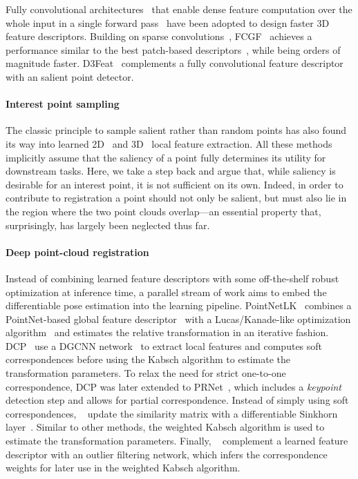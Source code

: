 Fully convolutional architectures~\cite{long2015fully} that enable dense feature computation over the whole input in a single forward pass~\cite{detone2018superpoint, dusmanu2019d2Net, revaud2019r2d2} have been adopted to design faster 3D feature descriptors. Building on sparse convolutions~\cite{choy2019Minkowski}, FCGF~\cite{Choy2019FCGF} achieves
a performance similar to the best patch-based descriptors~\cite{gojcic20193DSmoothNet}, while being orders of magnitude faster. D3Feat~\cite{bai2020d3feat} complements
a fully convolutional feature descriptor with an salient point detector. 


\paragraph{Interest point sampling} 
The classic principle to sample salient rather than random  points
has also found its way into learned 2D~\cite{detone2018superpoint, dusmanu2019d2Net,revaud2019r2d2, wiles2020d2d} and 3D~\cite{yew20183dfeat, bai2020d3feat,lu2020rskdd} local feature extraction.
All these methods implicitly assume that the saliency of a point fully determines its utility for downstream tasks. Here, we take a step back and argue that, while saliency is desirable for an interest point, it is not sufficient on its own. Indeed, in order to contribute to registration a point should not only be salient, but must also lie in the region where the two point clouds overlap---an essential property that, surprisingly, has largely been neglected thus far.


\paragraph{Deep point-cloud registration} 
Instead of combining learned feature descriptors with some
off-the-shelf robust optimization at inference time, a parallel stream of work aims to embed the differentiable pose estimation into the learning pipeline. PointNetLK~\cite{aoki2019pointnetlk} combines a PointNet-based global feature descriptor~\cite{qi2017pointnet} with a Lucas/Kanade-like optimization algorithm~\cite{lucas1981LK} and estimates the relative transformation in an iterative fashion.
DCP~\cite{wang2019dcp} use a DGCNN network~\cite{wang2019dynamic} to extract local features and computes soft correspondences before using the Kabsch algorithm to estimate the transformation parameters. To relax the need for strict one-to-one correspondence, DCP was later extended to PRNet~\cite{wang2019prnet}, which includes a \textit{keypoint} detection step and allows for partial correspondence. Instead of simply using soft correspondences, ~\cite{yew2020rpm} %
update the similarity matrix with a differentiable Sinkhorn layer~\cite{sinkhorn1964relationship}. Similar to other methods, the weighted Kabsch algorithm\cite{4767965} is used to estimate the transformation parameters. Finally, ~\cite{gojcic2020learning,choy2020deep,pais20203dregnet}
complement a learned feature descriptor with an outlier filtering network, which infers the correspondence weights for later use in the weighted Kabsch algorithm. 


